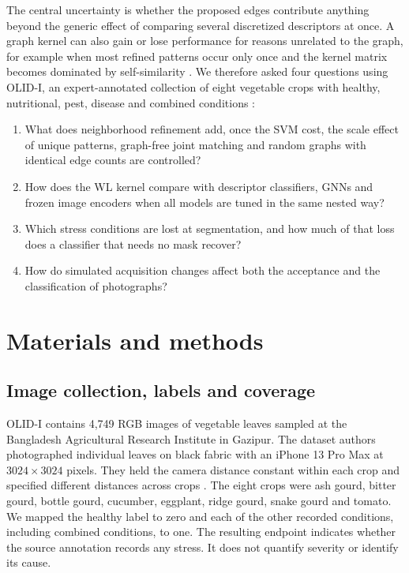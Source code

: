 The central uncertainty is whether the proposed edges contribute anything beyond the generic effect of comparing several discretized descriptors at once. A graph kernel can also gain or lose performance for reasons unrelated to the graph, for example when most refined patterns occur only once and the kernel matrix becomes dominated by self-similarity \citep{Yanardag2015,Greene2006}. We therefore asked four questions using OLID-I, an expert-annotated collection of eight vegetable crops with healthy, nutritional, pest, disease and combined conditions \citep{Orka2023}:
\begin{enumerate}
\item What does neighborhood refinement add, once the SVM cost, the scale effect of unique patterns, graph-free joint matching and random graphs with identical edge counts are controlled?
\item How does the WL kernel compare with descriptor classifiers, GNNs and frozen image encoders when all models are tuned in the same nested way?
\item Which stress conditions are lost at segmentation, and how much of that loss does a classifier that needs no mask recover?
\item How do simulated acquisition changes affect both the acceptance and the classification of photographs?
\end{enumerate}

\section{Materials and methods}
\subsection{Image collection, labels and coverage}
OLID-I contains 4,749 RGB images of vegetable leaves sampled at the Bangladesh Agricultural Research Institute in Gazipur. The dataset authors photographed individual leaves on black fabric with an iPhone 13 Pro Max at $3024\times3024$ pixels. They held the camera distance constant within each crop and specified different distances across crops \citep{Orka2023}. The eight crops were ash gourd, bitter gourd, bottle gourd, cucumber, eggplant, ridge gourd, snake gourd and tomato. We mapped the healthy label to zero and each of the other recorded conditions, including combined conditions, to one. The resulting endpoint indicates whether the source annotation records any stress. It does not quantify severity or identify its cause.

